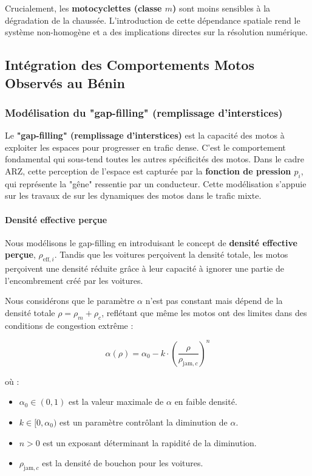 Crucialement, les \textbf{motocyclettes (classe $m$)} sont moins sensibles à la dégradation de la chaussée. L'introduction de cette dépendance spatiale rend le système non-homogène et a des implications directes sur la résolution numérique.

\subsection{Intégration des Comportements Motos Observés au Bénin}
\subsubsection{Modélisation du "gap-filling" (remplissage d'interstices)}
Le \textbf{"gap-filling" (remplissage d'interstices)} est la capacité des motos à exploiter les espaces pour progresser en trafic dense. C'est le comportement fondamental qui sous-tend toutes les autres spécificités des motos. Dans le cadre ARZ, cette perception de l'espace est capturée par la \textbf{fonction de pression $p_i$}, qui représente la "gêne" ressentie par un conducteur. Cette modélisation s'appuie sur les travaux de \cite{Lee2009} sur les dynamiques des motos dans le trafic mixte.

\paragraph{Densité effective perçue}
Nous modélisons le gap-filling en introduisant le concept de \textbf{densité effective perçue}, $\rho_{\text{eff},i}$. Tandis que les voitures perçoivent la densité totale, les motos perçoivent une densité réduite grâce à leur capacité à ignorer une partie de l'encombrement créé par les voitures.

Nous considérons que le paramètre $\alpha$ n'est pas constant mais dépend de la densité totale $\rho = \rho_m + \rho_c$, reflétant que même les motos ont des limites dans des conditions de congestion extrême :

\begin{equation}
\alpha(\rho) = \alpha_0 - k \cdot \left( \frac{\rho}{\rho_{\text{jam},c}} \right)^n
\end{equation}

où :
\begin{itemize}
    \item $\alpha_0 \in (0,1)$ est la valeur maximale de $\alpha$ en faible densité.
    \item $k \in [0, \alpha_0)$ est un paramètre contrôlant la diminution de $\alpha$.
    \item $n > 0$ est un exposant déterminant la rapidité de la diminution.
    \item $\rho_{\text{jam},c}$ est la densité de bouchon pour les voitures.
\end{itemize}

